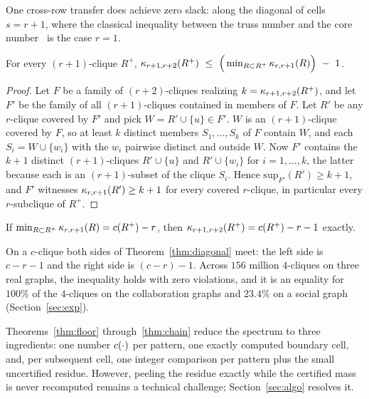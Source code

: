 One cross-row transfer does achieve zero slack: along the diagonal of cells $s=r{+}1$, where the classical inequality between the truss number and the core number~\cite{cohen2008trusses} is the case $r=1$.

\begin{theorem}
\label{thm:diagonal}
For every $(r{+}1)$-clique $R^{+}$,
$\corev{r+1,r+2}(R^{+})\ \le\ \Big(\min_{R\subset R^{+}} \corev{r,r+1}(R)\Big)\ -\ 1$.
\end{theorem}
\begin{proof}
Let $F$ be a family of $(r{+}2)$-cliques realizing $k=\kappa_{r+1,r+2}(R^{+})$, and let $F'$ be the family of all $(r{+}1)$-cliques contained in members of $F$.
%
Let $R'$ be any $r$-clique covered by $F'$ and pick $W=R'\cup\{u\}\in F'$.
%
$W$ is an $(r{+}1)$-clique covered by $F$, so at least $k$ distinct members $S_1,\dots,S_k$ of $F$ contain $W$, and each $S_i=W\cup\{w_i\}$ with the $w_i$ pairwise distinct and outside $W$.
%
Now $F'$ contains the $k{+}1$ distinct $(r{+}1)$-cliques $R'\cup\{u\}$ and $R'\cup\{w_i\}$ for $i=1,\dots,k$, the latter because each is an $(r{+}1)$-subset of the clique $S_i$.
%
Hence $\mathrm{sup}_{F'}(R')\ge k+1$, and $F'$ witnesses $\kappa_{r,r+1}(R')\ge k+1$ for every covered $r$-clique, in particular every $r$-subclique of $R^{+}$.
\end{proof}

\begin{corollary}
\label{cor:diagcert}
If $\min_{R\subset R^{+}}\kappa_{r,r+1}(R)=c(R^{+})-r$, then $\kappa_{r+1,r+2}(R^{+})=c(R^{+})-r-1$ exactly.
\end{corollary}

\begin{remark}
On a $c$-clique both sides of Theorem~\ref{thm:diagonal} meet: the left side is $c-r-1$ and the right side is $(c-r)-1$.
%
Across $156$ million $4$-cliques on three real graphs, the inequality holds with zero violations, and it is an equality for $100\%$ of the $4$-cliques on the collaboration graphs and $23.4\%$ on a social graph (Section~\ref{sec:exp}).
\end{remark}

Theorems~\ref{thm:floor} through~\ref{thm:chain} reduce the spectrum to three ingredients: one number $c(\cdot)$ per pattern, one exactly computed boundary cell, and, per subsequent cell, one integer comparison per pattern plus the small uncertified residue.
%
However, peeling the residue exactly while the certified mass is never recomputed remains a technical challenge; Section~\ref{sec:algo} resolves it.
